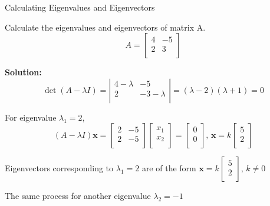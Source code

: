\documentclass{beamer}
\begin{document}
        \begin{frame}{Calculating Eigenvalues and Eigenvectors}
        \begin{examples}
        Calculate the eigenvalues and eigenvectors of matrix A.
        \begin{equation*}
            A=\left[ \begin{matrix}
            4&		-5\\
            2&		3\\
        \end{matrix} \right]
        \end{equation*}
        \end{examples}
        \textbf{Solution:}
        \begin{equation*}
            \det \left( A-\lambda I \right) =\left| \begin{matrix}
            4-\lambda&		-5\\
            2&		-3-\lambda\\
        \end{matrix} \right|=\left( \lambda -2 \right) \left( \lambda +1 \right) =0
        \end{equation*}
        
        For eigenvalue $\lambda_1=2$,
        \begin{equation*}
            \left( A-\lambda I \right) \mathbf{x}=\left[ \begin{matrix}
            2&		-5\\
            2&		-5\\
        \end{matrix} \right] \left[ \begin{array}{c}
            x_1\\
            x_2\\
        \end{array} \right] =\left[ \begin{array}{c}
            0\\
            0\\
        \end{array} \right] , \, \mathbf{x}=k\left[ \begin{array}{c}
            5\\
            2\\
        \end{array} \right]
        \end{equation*}
        
        Eigenvectors corresponding to $\lambda_1=2$ are of the form $\mathbf{x}=k\left[ \begin{array}{c}
            5\\
            2\\
        \end{array} \right],\,k\ne 0$
        
        The same process for another eigenvalue $\lambda_2=-1$
        \end{frame}
        
\end{document}
